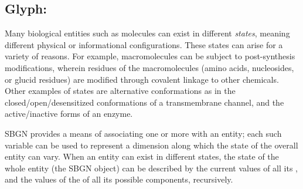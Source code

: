 
\subsection{Glyph: }
\label{sec:stateVariable}

Many biological entities such as molecules can exist in different \emph{states}, meaning different physical or informational configurations.  These states can arise for a variety of reasons.  For example, macromolecules can be subject to post-synthesis modifications, wherein residues of the macromolecules (amino acids, nucleosides, or glucid residues) are modified through covalent linkage to other chemicals.  Other examples of states are alternative conformations as in the closed/open/desensitized conformations of a transmembrane channel, and the active/inactive forms of an enzyme.

SBGN provides a means of associating one or more  with an entity; each such variable can be used to represent a dimension along which the state of the overall entity can vary.  When an entity can exist in different states, the state of the whole entity (\ie the SBGN object) can be described by the current values of all its , and the values of the  of all its possible components, recursively.

